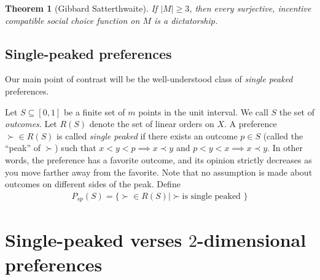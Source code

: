 \documentclass[12pt]{article}
\newtheorem{theorem}{Theorem}
\newcommand{\1}[1]{\mathds{1}[{#1}]}
\begin{document}
    \begin{theorem}[Gibbard Satterthwaite]
      If $|M| \ge 3$, then
      every surjective, incentive compatible social choice function on $M$
      is a dictatorship.
    \end{theorem}

  \subsection{Single-peaked preferences}
    Our main point of contrast will be the well-understood class of
    \emph{single peaked} preferences.

    Let $S\subseteq [0,1]$ be a finite set of $m$ points in the unit interval.
    We call $S$ the set of \emph{outcomes}.
    Let $R(S)$ denote the set of linear orders on $X$.
    A preference $\succ \in R(S)$ is called \emph{single peaked} if
    there exists an outcome $p\in S$ (called the ``peak'' of $\succ$)
    such that $x < y < p \implies x \prec y$ and $p < y < x \implies x \prec y$.
    In other words, the preference has a favorite outcome,
    and its opinion strictly decreases as you move farther away from the favorite.
    Note that no assumption is made about outcomes on different sides of the peak.
    Define
    \begin{align*}
      P_{sp}(S) = \{ \succ \in R(S) | \succ \text{is single peaked }\}
    \end{align*}


\section{Single-peaked verses $2$-dimensional preferences}
\end{document}
